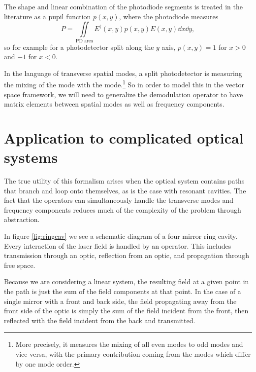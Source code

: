 The shape and linear combination of the photodiode segments is treated in the literature\cite{Hefetz:97} as a pupil function $p(x,y)$,  where the photodiode measures
\begin{equation}
P=\iint\limits_{\text{PD area}}E^\dagger(x,y)p(x,y)E(x,y)\dd x \dd y,
\end{equation}
so for example for a photodetector split along the $y$ axis, $p(x,y)=1$ for $x>0$ and $-1$ for $x<0$.


In the language of transverse spatial modes, a split photodetector is measuring the mixing of the  mode with the  mode.\footnote{More precisely, it measures the mixing of all even modes to odd modes and vice versa, with the primary contribution coming from the modes which differ by one mode order.}  So in order to model this in the vector space framework, we will need to generalize the demodulation operator to have matrix elements between spatial modes as well as frequency components.


\section{Application to complicated optical systems}
The true utility of this formalism arises when the optical system contains paths that branch and loop onto themselves, as is the case with resonant cavities. %
The fact that the operators can simultaneously handle the transverse modes and frequency components reduces much of the complexity of the problem through abstraction.

In figure \ref{fig:ringcav}  we see a schematic diagram of a four mirror ring cavity. %
Every interaction of the laser field is handled by an operator. %
This includes transmission through an optic, reflection from an optic, and propagation through free space. %


Because we are considering a linear system, the resulting field at a given point in the path is just the sum of the field components at that point. %
In the case of a single mirror with a front and back side, the field propagating away from the front side of the optic is simply the sum of the field incident from the front, then reflected with the field incident from the back and transmitted. %

